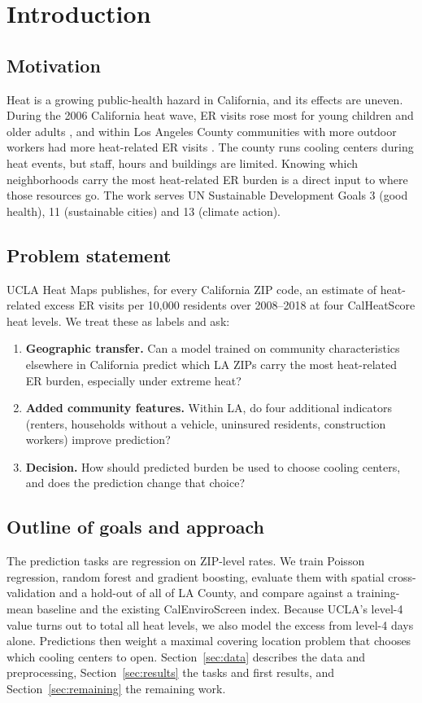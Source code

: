 \documentclass[10pt]{article}
\begin{document}
\section{Introduction}

\subsection{Motivation}
Heat is a growing public-health hazard in California, and its effects are uneven. During the 2006 California heat wave, ER visits rose most for young children and older adults \cite{knowlton2009}, and within Los Angeles County communities with more outdoor workers had more heat-related ER visits \cite{riley2018}. The county runs cooling centers during heat events, but staff, hours and buildings are limited. Knowing which neighborhoods carry the most heat-related ER burden is a direct input to where those resources go. The work serves UN Sustainable Development Goals 3 (good health), 11 (sustainable cities) and 13 (climate action).

\subsection{Problem statement}
UCLA Heat Maps publishes, for every California ZIP code, an estimate of heat-related excess ER visits per 10,000 residents over 2008--2018 at four CalHeatScore heat levels. We treat these as labels and ask:
\begin{enumerate}
\item \textbf{Geographic transfer.} Can a model trained on community characteristics elsewhere in California predict which LA ZIPs carry the most heat-related ER burden, especially under extreme heat?
\item \textbf{Added community features.} Within LA, do four additional indicators (renters, households without a vehicle, uninsured residents, construction workers) improve prediction?
\item \textbf{Decision.} How should predicted burden be used to choose cooling centers, and does the prediction change that choice?
\end{enumerate}

\subsection{Outline of goals and approach}
The prediction tasks are regression on ZIP-level rates. We train Poisson regression, random forest and gradient boosting, evaluate them with spatial cross-validation and a hold-out of all of LA County, and compare against a training-mean baseline and the existing CalEnviroScreen index. Because UCLA's level-4 value turns out to total all heat levels, we also model the excess from level-4 days alone. Predictions then weight a maximal covering location problem that chooses which cooling centers to open. Section~\ref{sec:data} describes the data and preprocessing, Section~\ref{sec:results} the tasks and first results, and Section~\ref{sec:remaining} the remaining work.
\end{document}
